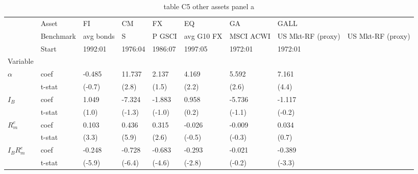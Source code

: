 \begin{table}[htbp]
  \centering
  \caption{table C5 other assets panel a}
  \label{tab:table_C5_other_assets_panel_a}
  \begin{tabular}{llllllll}
\toprule
 & Asset & FI & CM & FX & EQ & GA & GALL \\
 & Benchmark & avg bonds & S&P GSCI & avg G10 FX & MSCI ACWI & US Mkt-RF (proxy) & US Mkt-RF (proxy) \\
 & Start & 1992:01 & 1976:04 & 1986:07 & 1997:05 & 1972:01 & 1972:01 \\
Variable &  &  &  &  &  &  &  \\
\midrule
{} & coef & -0.485 & 11.737 & 2.137 & 4.169 & 5.592 & 7.161 \\
 & t-stat & (-0.7) & (2.8) & (1.5) & (2.2) & (2.6) & (4.4) \\
 & coef & 1.049 & -7.324 & -1.883 & 0.958 & -5.736 & -1.117 \\
 & t-stat & (1.0) & (-1.3) & (-1.0) & (0.2) & (-1.1) & (-0.2) \\
 & coef & 0.103 & 0.436 & 0.315 & -0.026 & -0.009 & 0.034 \\
 & t-stat & (3.3) & (5.9) & (2.6) & (-0.5) & (-0.3) & (0.7) \\
 & coef & -0.248 & -0.728 & -0.683 & -0.293 & -0.021 & -0.389 \\
 & t-stat & (-5.9) & (-6.4) & (-4.6) & (-2.8) & (-0.2) & (-3.3) \\
\bottomrule
\end{tabular}

\end{table}
